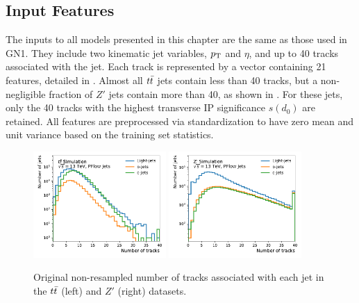 \subsection{Input Features}

The inputs to all models presented in this chapter are the same as those used in GN1.
They include two kinematic jet variables, $p_{\text{T}}$ and $\eta$, and up to 40 tracks associated with the jet.
Each track is represented by a vector containing 21 features, detailed in .
Almost all $t\bar{t}$ jets contain less than 40 tracks, but a non-negligible fraction of $Z'$ jets contain more than 40, as shown in .
For these jets, only the 40 tracks with the highest transverse IP significance $s(d_0)$ are retained.
All features are preprocessed via standardization to have zero mean and unit variance based on the training set statistics.

\begin{figure}
    \centering
    \includegraphics[width=0.45\textwidth]{figures/flavour_tagging/ttbar_2.pdf}
    \includegraphics[width=0.45\textwidth]{figures/flavour_tagging/zprime_2.pdf}
    \caption{Original non-resampled number of tracks associated with each jet in the $t\bar{t}$ (left) and $Z'$ (right) datasets.}
    \label{fig:track_multiplicity}
\end{figure}

